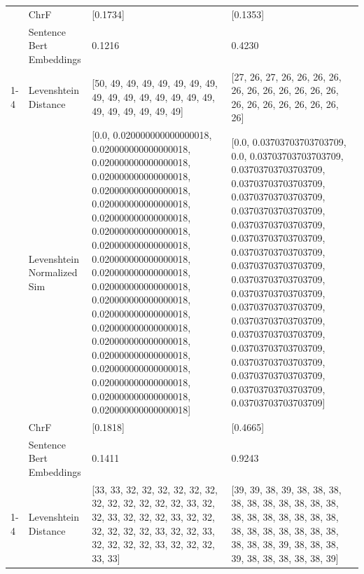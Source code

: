 \begin{tabular}{llll}
 & ChrF & [0.1734] & [0.1353] \\
 & Sentence Bert Embeddings & 0.1216 & 0.4230 \\
\cline{1-4}
\multirow[t]{4}{*}{Mburi ti marigu} & Levenshtein Distance & [50, 49, 49, 49, 49, 49, 49, 49, 49, 49, 49, 49, 49, 49, 49, 49, 49, 49, 49, 49, 49, 49] & [27, 26, 27, 26, 26, 26, 26, 26, 26, 26, 26, 26, 26, 26, 26, 26, 26, 26, 26, 26, 26, 26] \\
 & Levenshtein Normalized Sim & [0.0, 0.020000000000000018, 0.020000000000000018, 0.020000000000000018, 0.020000000000000018, 0.020000000000000018, 0.020000000000000018, 0.020000000000000018, 0.020000000000000018, 0.020000000000000018, 0.020000000000000018, 0.020000000000000018, 0.020000000000000018, 0.020000000000000018, 0.020000000000000018, 0.020000000000000018, 0.020000000000000018, 0.020000000000000018, 0.020000000000000018, 0.020000000000000018, 0.020000000000000018, 0.020000000000000018] & [0.0, 0.03703703703703709, 0.0, 0.03703703703703709, 0.03703703703703709, 0.03703703703703709, 0.03703703703703709, 0.03703703703703709, 0.03703703703703709, 0.03703703703703709, 0.03703703703703709, 0.03703703703703709, 0.03703703703703709, 0.03703703703703709, 0.03703703703703709, 0.03703703703703709, 0.03703703703703709, 0.03703703703703709, 0.03703703703703709, 0.03703703703703709, 0.03703703703703709, 0.03703703703703709] \\
 & ChrF & [0.1818] & [0.4665] \\
 & Sentence Bert Embeddings & 0.1411 & 0.9243 \\
\cline{1-4}
\multirow[t]{4}{*}{Mundu muka na iguru itimenyagirwo} & Levenshtein Distance & [33, 33, 32, 32, 32, 32, 32, 32, 32, 32, 32, 32, 32, 32, 33, 32, 32, 33, 32, 32, 32, 33, 32, 32, 32, 32, 32, 32, 33, 32, 32, 33, 32, 32, 32, 32, 33, 32, 32, 32, 33, 33] & [39, 39, 38, 39, 38, 38, 38, 38, 38, 38, 38, 38, 38, 38, 38, 38, 38, 38, 38, 38, 38, 38, 38, 38, 38, 38, 38, 38, 38, 38, 38, 39, 38, 38, 38, 39, 38, 38, 38, 38, 38, 39] \\

\end{tabular}
